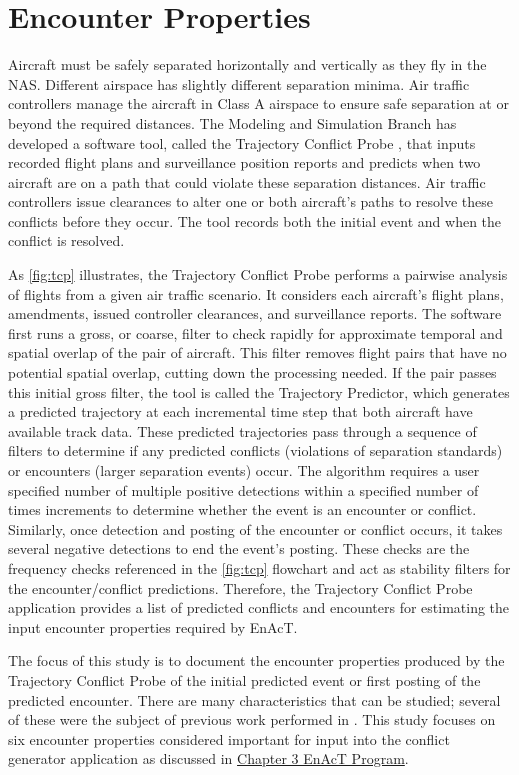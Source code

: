 \section{Encounter Properties}
Aircraft must be safely separated horizontally and vertically as they fly in the NAS. Different airspace has slightly different separation minima. Air traffic controllers manage the aircraft in Class A airspace to ensure safe separation at or beyond the required distances. The Modeling and Simulation Branch has developed a software tool, called the Trajectory Conflict Probe \cite{paglione:2008}, that inputs recorded flight plans and surveillance position reports and predicts when two aircraft are on a path that could violate these separation distances. Air traffic controllers issue clearances to alter one or both aircraft’s paths to resolve these conflicts before they occur. The tool records both the initial event and when the conflict is resolved. 

As \ref{fig:tcp} illustrates, the Trajectory Conflict Probe performs a pairwise analysis of flights from a given air traffic scenario. It considers each aircraft’s flight plans, amendments, issued controller clearances, and surveillance reports. The software first runs a gross, or coarse, filter to check rapidly for approximate temporal and spatial overlap of the pair of aircraft. This filter removes flight pairs that have no potential spatial overlap, cutting down the processing needed. If the pair passes this initial gross filter, the tool is called the Trajectory Predictor, which generates a predicted trajectory at each incremental time step that both aircraft have available track data. These predicted trajectories pass through a sequence of filters to determine if any predicted conflicts (violations of separation standards) or encounters (larger separation events) occur. The algorithm requires a user specified number of multiple positive detections within a specified number of times increments to determine whether the event is an encounter or conflict. Similarly, once detection and posting of the encounter or conflict occurs, it takes several negative detections to end the event’s posting. These checks are the frequency checks referenced in the \ref{fig:tcp} flowchart and act as stability filters for the encounter/conflict predictions. Therefore, the Trajectory Conflict Probe application provides a list of predicted conflicts and encounters for estimating the input encounter properties required by EnAcT.

The focus of this study is to document the encounter properties produced by the Trajectory Conflict Probe of the initial predicted event or first posting of the predicted encounter. There are many characteristics that can be studied; several of these were the subject of previous work performed in \cite{paglione:2008}. This study focuses on six encounter properties considered important for input into the conflict generator application as discussed in \hyperref[chap:enactprogram]{Chapter 3 EnAcT Program}.

